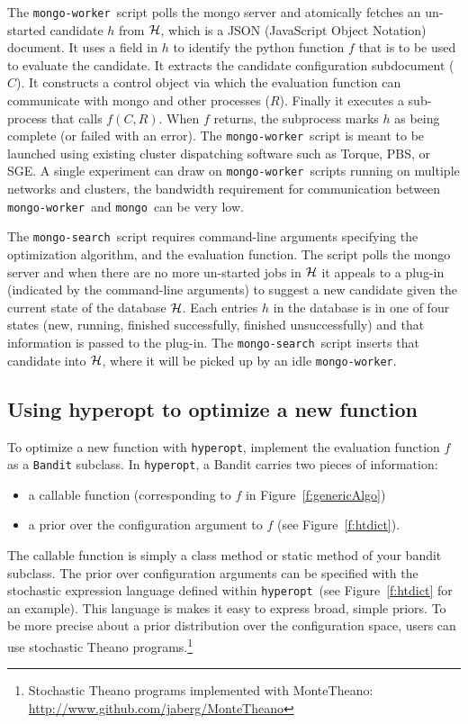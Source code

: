 \documentclass{article}
\newcommand{\hyperopt}{{\tt hyperopt}}
\newcommand{\mongo}{{\tt mongo}}
\newcommand{\mongoworker}{{\tt mongo-worker}}
\newcommand{\mongosearch}{{\tt mongo-search}}
\begin{document}
The \mongoworker\ script polls the mongo server and
atomically fetches an un-started candidate $h$ from ${\cal H}$, which is a JSON (JavaScript Object Notation) document.
It uses a field in $h$ to identify the python function $f$ that is to be used to evaluate the candidate.
It extracts the candidate configuration subdocument ($C$).
It constructs a control object via which the evaluation function can communicate with mongo and other processes ($R$).
Finally it executes a sub-process that calls $f(C, R)$.
When $f$ returns, the subprocess marks $h$ as being complete (or failed with an error).
The \mongoworker\ script is meant to be launched using existing cluster dispatching software such as Torque, PBS, or SGE.
A single experiment can draw on \mongoworker\ scripts running on multiple networks and clusters,
the bandwidth requirement for communication between \mongoworker\ and \mongo\ can be very low.

The \mongosearch\ script requires command-line arguments specifying the optimization algorithm, and the evaluation function.
The script polls the mongo server
and when there are no more un-started jobs in ${\cal H}$ it appeals to a plug-in (indicated by the command-line arguments)
to suggest a new candidate given the current state of the database ${\cal H}$.
Each entries $h$ in the database is in one of four states (new, running, finished successfully, finished unsuccessfully)
and that information is passed to the plug-in.
The \mongosearch\ script inserts that candidate into ${\cal H}$, where it will be picked up by an idle \mongoworker.

\subsection{Using hyperopt to optimize a new function}

To optimize a new function with \hyperopt, implement the evaluation function $f$ as a {\tt Bandit} subclass.
In \hyperopt, a Bandit carries two pieces of information:
\begin{itemize}
    \item a callable function (corresponding to $f$ in Figure~\ref{f:genericAlgo})
    \item a prior over the configuration argument to $f$ (see Figure~\ref{f:htdict}).
\end{itemize}
The callable function is simply a class method or static method of your bandit subclass.
The prior over configuration arguments can be specified with the stochastic expression
language defined within \hyperopt\ (see Figure~\ref{f:htdict} for an example).
This language is makes it easy to express broad, simple priors.
To be more precise about a prior distribution over the configuration space,
users can use stochastic Theano programs.\footnote{
Stochastic Theano programs implemented with MonteTheano:
\url{http://www.github.com/jaberg/MonteTheano}}
\end{document}
